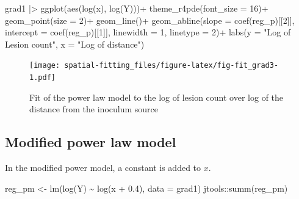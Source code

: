 \documentclass[
  letterpaper,
]{book}
\newenvironment{Shaded}{\begin{snugshade}}{\end{snugshade}}
\newcommand{\AttributeTok}[1]{\textcolor[rgb]{0.40,0.45,0.13}{#1}}
\newcommand{\DecValTok}[1]{\textcolor[rgb]{0.68,0.00,0.00}{#1}}
\newcommand{\FloatTok}[1]{\textcolor[rgb]{0.68,0.00,0.00}{#1}}
\newcommand{\FunctionTok}[1]{\textcolor[rgb]{0.28,0.35,0.67}{#1}}
\newcommand{\NormalTok}[1]{\textcolor[rgb]{0.00,0.23,0.31}{#1}}
\newcommand{\OtherTok}[1]{\textcolor[rgb]{0.00,0.23,0.31}{#1}}
\newcommand{\SpecialCharTok}[1]{\textcolor[rgb]{0.37,0.37,0.37}{#1}}
\newcommand{\StringTok}[1]{\textcolor[rgb]{0.13,0.47,0.30}{#1}}
\begin{document}
\begin{Shaded}
\begin{Highlighting}[]
\NormalTok{grad1 }\SpecialCharTok{|\textgreater{}} 
  \FunctionTok{ggplot}\NormalTok{(}\FunctionTok{aes}\NormalTok{(}\FunctionTok{log}\NormalTok{(x), }\FunctionTok{log}\NormalTok{(Y)))}\SpecialCharTok{+}
  \FunctionTok{theme\_r4pde}\NormalTok{(}\AttributeTok{font\_size =} \DecValTok{16}\NormalTok{)}\SpecialCharTok{+}
  \FunctionTok{geom\_point}\NormalTok{(}\AttributeTok{size =} \DecValTok{2}\NormalTok{)}\SpecialCharTok{+}
  \FunctionTok{geom\_line}\NormalTok{()}\SpecialCharTok{+}
  \FunctionTok{geom\_abline}\NormalTok{(}\AttributeTok{slope =} \FunctionTok{coef}\NormalTok{(reg\_p)[[}\DecValTok{2}\NormalTok{]], }\AttributeTok{intercept =} \FunctionTok{coef}\NormalTok{(reg\_p)[[}\DecValTok{1}\NormalTok{]],}
              \AttributeTok{linewidth =} \DecValTok{1}\NormalTok{, }\AttributeTok{linetype =} \DecValTok{2}\NormalTok{)}\SpecialCharTok{+}
 \FunctionTok{labs}\NormalTok{(}\AttributeTok{y =} \StringTok{"Log of Lesion count"}\NormalTok{,}
       \AttributeTok{x =} \StringTok{"Log of distance"}\NormalTok{)}
\end{Highlighting}
\end{Shaded}

\begin{figure}

{\centering \texttt{[image: spatial-fitting\_files/figure-latex/fig-fit\_grad3-1.pdf]}

}

\caption{\label{fig-fit_grad3}Fit of the power law model to the log of
lesion count over log of the distance from the inoculum source}

\end{figure}

\hypertarget{modified-power-law-model}{%
\subsection{Modified power law model}\label{modified-power-law-model}}

In the modified power model, a constant is added to \(x\).

\begin{Shaded}
\begin{Highlighting}[]
\NormalTok{reg\_pm }\OtherTok{\textless{}{-}} \FunctionTok{lm}\NormalTok{(}\FunctionTok{log}\NormalTok{(Y) }\SpecialCharTok{\textasciitilde{}} \FunctionTok{log}\NormalTok{(x }\SpecialCharTok{+} \FloatTok{0.4}\NormalTok{), }\AttributeTok{data =}\NormalTok{ grad1)}
\NormalTok{jtools}\SpecialCharTok{::}\FunctionTok{summ}\NormalTok{(reg\_pm)}
\end{Highlighting}
\end{Shaded}
\end{document}
